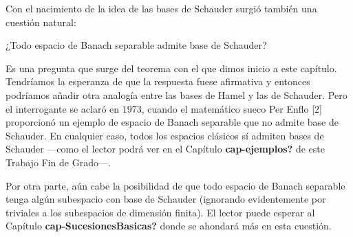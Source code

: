 \documentclass[
  spanish,
  letterpaper,
  DIV=11,
  numbers=noendperiod]{scrreprt}
\theoremstyle{definition}
\theoremstyle{remark}
\theoremstyle{definition}
\theoremstyle{exampstyle}
\theoremstyle{plain}
\theoremstyle{plain}
\theoremstyle{definition}
\theoremstyle{plain}
\theoremstyle{remark}
\begin{document}
Con el nacimiento de la idea de las bases de Schauder surgió también una
cuestión natural:

¿Todo espacio de Banach separable admite base de Schauder?

Es una pregunta que surge del teorema con el que dimos inicio a este
capítulo. Tendríamos la esperanza de que la respuesta fuese afirmativa y
entonces podríamos añadir otra analogía entre las bases de Hamel y las
de Schauder. Pero el interrogante se aclaró en \(1973\), cuando el
matemático sueco Per Enflo {[}2{]} proporcionó un ejemplo de espacio de
Banach separable que no admite base de Schauder. En cualquier caso,
todos los espacios clásicos sí admiten bases de Schauder ---como el
lector podrá ver en el Capítulo \textbf{cap-ejemplos?} de este Trabajo
Fin de Grado---.

Por otra parte, aún cabe la posibilidad de que todo espacio de Banach
separable tenga algún subespacio con base de Schauder (ignorando
evidentemente por triviales a los subespacios de dimensión finita). El
lector puede esperar al Capítulo \textbf{cap-SucesionesBasicas?} donde
se ahondará más en esta cuestión.

\renewcommand*{\proofname}{Demostración detallada de la Proposición \ref{proyections}}
\end{document}

